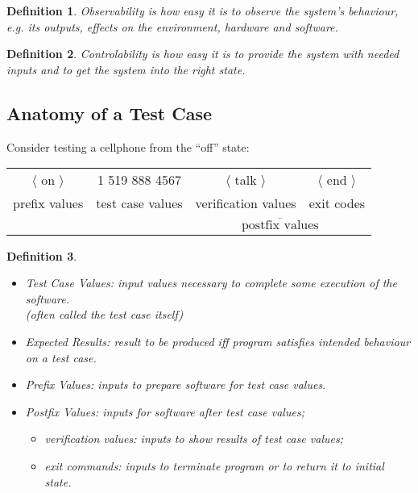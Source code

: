 \documentclass[11pt]{article}
\newtheorem{defn}{Definition}
\begin{document}
\begin{defn}
\emph{Observability} is how easy it is to observe the system's behaviour, e.g.
its outputs, effects on the environment, hardware and software.
\end{defn}

\begin{defn}
\emph{Controlability} is how easy it is to provide the system with
needed inputs and to get the system into the right state.
\end{defn}

\subsection*{Anatomy of a Test Case}
Consider testing a cellphone from the ``off'' state:

\begin{center}
\begin{tabular}{cccc}
\Large $\langle$ on $\rangle$ & \Large 1 519 888 4567 & \Large $\langle$ talk $\rangle$ &
    \Large $\langle$ end $\rangle$ \\
\scriptsize prefix values & \scriptsize test case values & \scriptsize verification values & \scriptsize exit codes \\
&& \multicolumn{2}{c}{$\overline{\mbox{~~~~~postfix values~~~~~}}$}
\end{tabular}
\end{center}

\begin{defn} ~\\[-2em]

\begin{itemize} 
\item \emph{Test Case Values}: input values necessary to complete some execution of the software.\\
  (often called the test case itself)
\item \emph{Expected Results}: result to be produced iff program satisfies intended behaviour on a test case.
\item \emph{Prefix Values}: inputs to prepare software for test case values.
\item \emph{Postfix Values}: inputs for software after test case values;
\begin{itemize}
\item \emph{verification values}: inputs to show results of test case values;
\item \emph{exit commands}: inputs to terminate program or to return it to initial state.
\end{itemize}
\end{itemize}
\end{defn}
\end{document}
